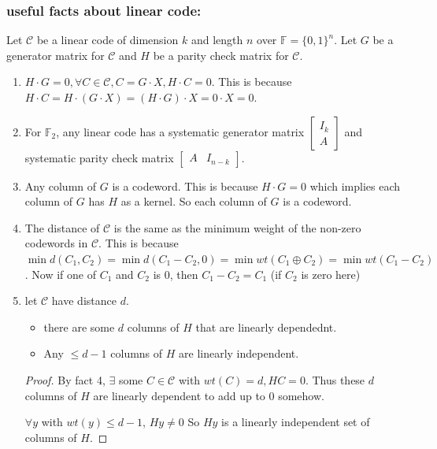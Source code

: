\documentclass[letterpaper,12pt]{article}
\begin{document}
\subsubsection{useful facts about linear code:}
Let $\mathcal{C}$ be a linear code of dimension $k$ and length $n$ over
$\mathbb{F}=\{0,1\}^n$. Let $G$ be a generator matrix for $\mathcal{C}$ and $H$
be a parity check matrix for $\mathcal{C}$.
\begin{enumerate}
    \item $H\cdot G=0,\forall C\in \mathcal{C}, C=G\cdot X, H\cdot C=0$. This is because $H\cdot C=H\cdot (G\cdot X)=(H\cdot G)\cdot X=0\cdot X=0$.
    \item For $\mathbb{F}_2$, any linear code has a systematic generator matrix $\begin{bmatrix}
                  I_k \\
                  A
              \end{bmatrix}$ and systematic parity check matrix $\begin{bmatrix}
                  A & I_{n-k}
              \end{bmatrix}$.
    \item Any column of $G$ is a codeword. This is because $H\cdot G=0$ which implies
          each column of $G$ has $H$ as a kernel. So each column of $G$ is a codeword.
    \item The distance of $\mathcal{C}$ is the same as the minimum weight of the non-zero
          codewords in $\mathcal{C}$. This is because $\min d(C_1,C_2) = \min
              d(C_1-C_2,0)=\min wt(C_1\oplus C_2)=\min wt(C_1-C_2)$. Now if one of $C_1$ and
          $C_2$ is 0, then $C_1-C_2=C_1$ (if $C_2$ is zero here)
    \item let $\mathcal{C}$ have distance $d$. \begin{itemize}
              \item there are some $d$ columns of $H$ that are linearly dependednt.
              \item Any $\le d-1$ columns of $H$ are linearly independent.
          \end{itemize}\begin{proof}
              By fact 4, $\exists$ some $C\in\mathcal{C}$ with $wt(C)=d, HC=0$. Thus these $d$ columns of $H$ are linearly dependent to add up to 0 somehow.

              $\forall y$ with $wt(y)\le d-1$, $Hy\neq 0$ So $Hy$ is a linearly independent set of columns of $H$.
          \end{proof}
\end{enumerate}
\end{document}
